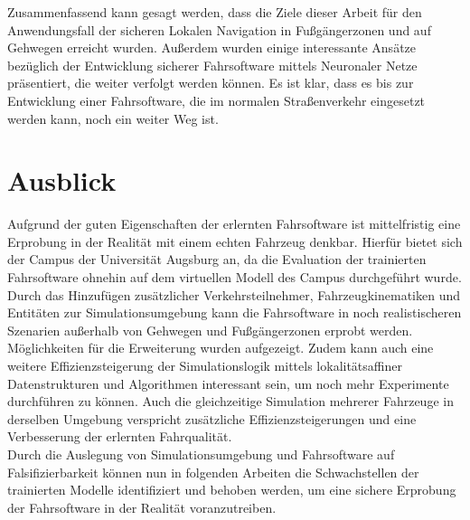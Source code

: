 Zusammenfassend kann gesagt werden, dass die Ziele dieser Arbeit für den Anwendungsfall
der sicheren Lokalen Navigation in Fußgängerzonen und auf Gehwegen erreicht wurden.
Außerdem wurden einige interessante Ansätze bezüglich der Entwicklung sicherer Fahrsoftware
mittels Neuronaler Netze präsentiert, die weiter verfolgt werden können. Es ist klar,
dass es bis zur Entwicklung einer Fahrsoftware, die im normalen Straßenverkehr eingesetzt
werden kann, noch ein weiter Weg ist.

\section{Ausblick}
Aufgrund der guten Eigenschaften der erlernten Fahrsoftware ist mittelfristig eine
Erprobung in der Realität mit einem echten Fahrzeug denkbar. Hierfür bietet sich
der Campus der Universität Augsburg an, da die Evaluation der trainierten Fahrsoftware
ohnehin auf dem virtuellen Modell des Campus durchgeführt wurde.\\

Durch das Hinzufügen zusätzlicher Verkehrsteilnehmer, Fahrzeugkinematiken und Entitäten
zur Simulationsumgebung kann die Fahrsoftware in noch realistischeren Szenarien
außerhalb von Gehwegen und Fußgängerzonen erprobt werden. Möglichkeiten für die
Erweiterung wurden aufgezeigt. Zudem kann auch eine weitere Effizienzsteigerung der
Simulationslogik mittels lokalitätsaffiner Datenstrukturen und Algorithmen interessant
sein, um noch mehr Experimente durchführen zu können. Auch die gleichzeitige Simulation
mehrerer Fahrzeuge in derselben Umgebung verspricht zusätzliche Effizienzsteigerungen
und eine Verbesserung der erlernten Fahrqualität.\\

Durch die Auslegung von Simulationsumgebung und Fahrsoftware auf Falsifizierbarkeit
können nun in folgenden Arbeiten die Schwachstellen der trainierten Modelle
identifiziert und behoben werden, um eine sichere Erprobung der Fahrsoftware in der
Realität voranzutreiben.

